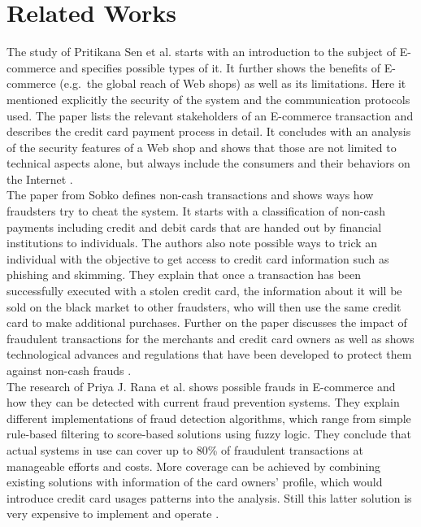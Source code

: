 
\chapter{Related Works}
\label{cha:related_works}

The study of Pritikana Sen et al. starts with an introduction to the subject of \gls{E-commerce} and specifies possible types of it. It further shows the benefits of \gls{E-commerce} (e.g.\ the global reach of Web shops) as well as its limitations. Here it mentioned explicitly the security of the system and the communication protocols used. The paper lists the relevant stakeholders of an \gls{E-commerce} transaction and describes the credit card payment process in detail. It concludes with an analysis of the security features of a Web shop and shows that those are not limited to technical aspects alone, but always include the consumers and their behaviors on the Internet \citep{sen2015study}. \\

The paper from Sobko defines non-cash transactions and shows ways how fraudsters try to cheat the system. It starts with a classification of non-cash payments including credit and debit cards that are handed out by financial institutions to individuals. The authors also note possible ways to trick an individual with the objective to get access to credit card information such as phishing and skimming. They explain that once a transaction has been successfully executed with a stolen credit card, the information about it will be sold on the black market to other fraudsters, who will then use the same credit card to make additional purchases. Further on the paper discusses the impact of fraudulent transactions for the merchants and credit card owners as well as shows technological advances and regulations that have been developed to protect them against non-cash frauds \citep{sobko2014fraud}. \\

The research of Priya J. Rana et al. shows possible frauds in \gls{E-commerce} and how they can be detected with current fraud prevention systems. They explain different implementations of fraud detection algorithms, which range from simple rule-based filtering to score-based solutions using fuzzy logic. They conclude that actual systems in use can cover up to 80\% of fraudulent transactions at manageable efforts and costs. More coverage can be achieved by combining existing solutions with information of the card owners' profile, which would introduce credit card usages patterns into the analysis. Still this latter solution is very expensive to implement and operate \citep{rana2015survey}. \\

